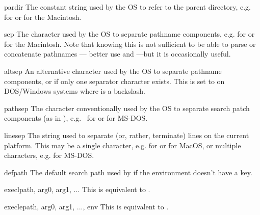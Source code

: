 \begin{datadesc}{pardir}
The constant string used by the OS to refer to the parent directory,
e.g.  for \POSIX{} or  for the Macintosh.
\end{datadesc}

\begin{datadesc}{sep}
The character used by the OS to separate pathname components,
e.g.  for \POSIX{} or  for the Macintosh.  Note that
knowing this is not sufficient to be able to parse or concatenate
pathnames --- better use  and
---but it is occasionally useful.
\end{datadesc}

\begin{datadesc}{altsep}
An alternative character used by the OS to separate pathname components,
or  if only one separator character exists.  This is set to
 on DOS/Windows systems where  is a backslash.
\end{datadesc}

\begin{datadesc}{pathsep}
The character conventionally used by the OS to separate search patch
components (as in ), e.g.\  for \POSIX{} or
 for MS-DOS.
\end{datadesc}

\begin{datadesc}{linesep}
The string used to separate (or, rather, terminate) lines on the
current platform.  This may be a single character, e.g. 
for \POSIX{} or  for MacOS, or multiple characters,
e.g.  for MS-DOS.
\end{datadesc}

\begin{datadesc}{defpath}
The default search path used by  if the environment
doesn't have a  key.
\end{datadesc}

\begin{funcdesc}{execl}{path, arg0, arg1, ...}
This is equivalent to
.
\end{funcdesc}

\begin{funcdesc}{execle}{path, arg0, arg1, ..., env}
This is equivalent to
.
\end{funcdesc}

